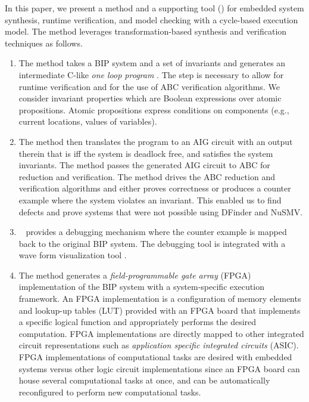 In this paper, we present a method and a supporting tool (\biptool)
for embedded system synthesis, runtime verification,
and model checking with a cycle-based execution model.
The method leverages transformation-based synthesis and verification techniques 
as follows. 

\begin{enumerate}
\item The method takes a BIP system and a set of invariants and generates 
  an intermediate C-like {\em one loop program } \caig. 
  The \caig step is necessary to allow for runtime verification and for the use
  of ABC verification algorithms. We consider invariant properties which are Boolean expressions
over atomic propositions. Atomic propositions express conditions
on components (e.g., current locations, values of variables).

\item The method then translates the \caig program to 
  an AIG circuit with an output therein that is \true iff the system 
  is deadlock free, and satisfies the system invariants. 
  The method passes the generated AIG circuit to ABC for reduction and 
  verification. 
  The method drives the ABC reduction and verification algorithms and 
  either proves correctness or produces a counter example where the 
  system violates an invariant. 
  This enabled us to find defects and prove systems that were not 
  possible using DFinder and NuSMV. 

\item  \biptool~ provides a debugging mechanism where the 
  counter example is mapped back to the original BIP system. 
  The debugging tool is integrated with a wave form visualization tool 
  \cite{bybell2010gtkwave}.  
\item The method generates a {\em field-programmable gate array} (FPGA) 
  implementation of the BIP system with a 
  system-specific execution framework. 
  An FPGA implementation is a configuration of 
  memory elements and lookup-up tables (LUT) provided with an FPGA board
  that implements a specific logical function
  and appropriately performs the desired computation. 
  FPGA implementations are directly mapped to other integrated circuit representations
  such as {\em application specific integrated circuits} (ASIC). 
  FPGA implementations of computational tasks are desired with embedded 
  systems versus other logic circuit implementations 
  since an FPGA board can house several computational tasks at once,
  and can be automatically reconfigured to perform new computational tasks. 


\end{enumerate}
